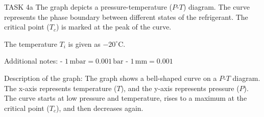 TASK 4a  
The graph depicts a pressure-temperature (\(P\)-\(T\)) diagram. The curve represents the phase boundary between different states of the refrigerant. The critical point (\(T_c\)) is marked at the peak of the curve.  

The temperature \(T_i\) is given as \(-20^\circ\text{C}\).  

Additional notes:  
- \(1 \, \text{mbar} = 0.001 \, \text{bar}\)  
- \(1 \, \text{mm} = 0.001\)  

Description of the graph:  
The graph shows a bell-shaped curve on a \(P\)-\(T\) diagram. The x-axis represents temperature (\(T\)), and the y-axis represents pressure (\(P\)). The curve starts at low pressure and temperature, rises to a maximum at the critical point (\(T_c\)), and then decreases again.